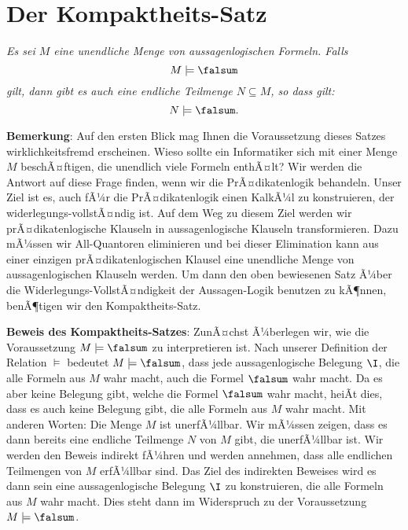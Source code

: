 \section{Der Kompaktheits-Satz}

\begin{Satz}
{\em
  Es sei $M$ eine unendliche Menge von aussagenlogischen Formeln.  Falls 
  \[ M \models \falsum \]
  gilt, dann gibt es auch eine endliche Teilmenge $N \subseteq M$, so dass gilt:
  \[ N \models \falsum. \]
}  
\end{Satz}

\noindent
\textbf{Bemerkung}:  Auf den ersten Blick mag Ihnen die Voraussetzung dieses Satzes
wirklichkeitsfremd erscheinen.  Wieso sollte ein Informatiker sich mit einer Menge $M$
beschÃ¤ftigen, die unendlich viele Formeln enthÃ¤lt?  Wir werden die Antwort auf diese Frage
finden, wenn wir die PrÃ¤dikatenlogik behandeln.  Unser Ziel ist es, auch fÃ¼r die
PrÃ¤dikatenlogik einen 
KalkÃ¼l zu konstruieren, der widerlegungs-vollstÃ¤ndig ist.  Auf dem Weg zu diesem Ziel 
werden wir prÃ¤dikatenlogische Klauseln in aussagenlogische Klauseln transformieren.
Dazu mÃ¼ssen wir All-Quantoren eliminieren und bei dieser Elimination kann aus einer
einzigen prÃ¤dikatenlogischen Klausel eine unendliche Menge von aussagenlogischen
Klauseln werden.  Um dann den oben bewiesenen Satz Ã¼ber die
Widerlegungs-VollstÃ¤ndigkeit der Aussagen-Logik benutzen zu kÃ¶nnen, benÃ¶tigen wir den
Kompaktheits-Satz.
\vspace*{0.1cm}

\noindent
\textbf{Beweis des Kompaktheits-Satzes}: 
ZunÃ¤chst Ã¼berlegen wir, wie die Voraussetzung $M \models \falsum$ zu interpretieren
ist.  Nach unserer Definition der Relation $\models$ bedeutet $M \models \falsum$, dass jede
aussagenlogische Belegung $\I$, die alle Formeln aus $M$ wahr macht, auch die
Formel $\falsum$ wahr macht.  Da es aber keine Belegung gibt, welche die Formel $\falsum$ wahr
macht, heiÃt dies, dass es auch keine Belegung gibt, die alle Formeln aus $M$ wahr
macht.  Mit anderen Worten: Die Menge $M$ ist unerfÃ¼llbar.  Wir mÃ¼ssen zeigen, dass
es dann bereits eine endliche Teilmenge $N$ von $M$ gibt, die unerfÃ¼llbar ist.
Wir werden den Beweis indirekt fÃ¼hren und werden annehmen, dass alle endlichen
Teilmengen von $M$ erfÃ¼llbar sind.  Das Ziel des indirekten Beweises wird es dann
sein eine aussagenlogische Belegung $\I$ zu konstruieren, die alle Formeln aus $M$
wahr macht.  Dies steht dann im Widerspruch zu der Voraussetzung $M \models \falsum$.

